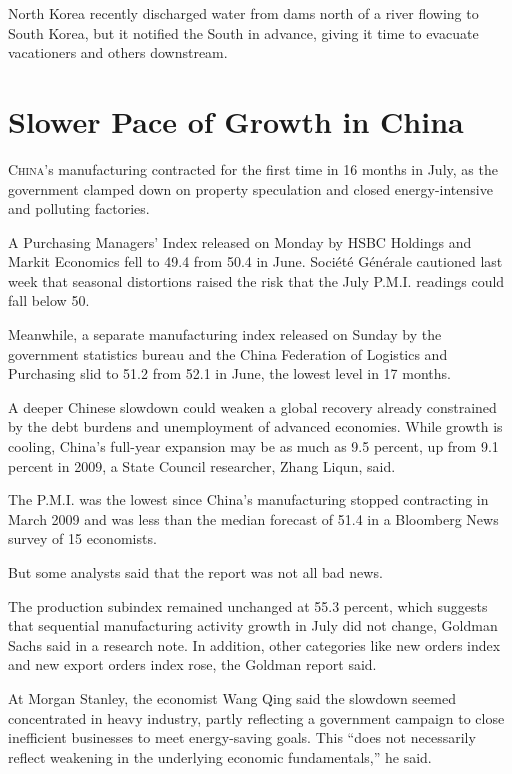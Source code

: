 ﻿\documentclass[12pt]{article}
\begin{document}
North Korea recently discharged water from dams north of a river flowing to South Korea, but it
notified the South in advance, giving it time to evacuate vacationers and others downstream.

\section{Slower Pace of Growth in China}

\lettrine{C}{hina}'s manufacturing contracted for the first time in 16
months in July, as the government clamped down on property speculation and closed energy-intensive
and polluting factories.

A Purchasing Managers' Index released on Monday by HSBC Holdings and Markit Economics fell to 49.4
from 50.4 in June. Soci\'et\'e G\'en\'erale cautioned last week that seasonal distortions raised the
risk that the July P.M.I. readings could fall below 50.

Meanwhile, a separate manufacturing index released on Sunday by the government statistics bureau and
the China Federation of Logistics and Purchasing slid to 51.2 from 52.1 in June, the lowest level in
17 months.

A deeper Chinese slowdown could weaken a global recovery already constrained by the debt burdens and
unemployment of advanced economies. While growth is cooling, China's full-year expansion may be as
much as 9.5 percent, up from 9.1 percent in 2009, a State Council researcher, Zhang Liqun, said.

The P.M.I. was the lowest since China's manufacturing stopped contracting in March 2009 and was less
than the median forecast of 51.4 in a Bloomberg News survey of 15 economists.

But some analysts said that the report was not all bad news.

The production subindex remained unchanged at 55.3 percent, which suggests that sequential
manufacturing activity growth in July did not change, Goldman Sachs said in a research note. In
addition, other categories like new orders index and new export orders index rose, the Goldman
report said.

At Morgan Stanley, the economist Wang Qing said the slowdown seemed concentrated in heavy industry,
partly reflecting a government campaign to close inefficient businesses to meet energy-saving goals.
This ``does not necessarily reflect weakening in the underlying economic fundamentals,'' he said.
\end{document}

